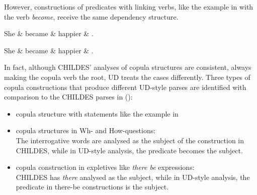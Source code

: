 However, constructions of predicates with linking verbs, like the example in  with the verb \emph{become}, receive the same dependency structure.\\

\begin{minipage}[b]{0.5\linewidth}
\begin{dependency}
	\begin{deptext}[column sep=0.5cm]
	She \& became \& happier \& .\\
	\end{deptext}
\end{dependency}
\end{minipage}
\begin{minipage}[b]{0.5\linewidth}
\begin{dependency}
	\begin{deptext}[column sep=0.5cm]
	She \& became \& happier \& .\\
	\end{deptext}
\end{dependency}
\end{minipage}
\label{fig:become}
\vspace{0.5em}

In fact, although CHILDES' analyses of copula structures are consistent, always making the copula verb the root, UD treats the cases differently. Three types of copula constructions that produce different UD-style parses are identified with comparison to the CHILDES parses in (\cite{liu2021}):
\begin{itemize}
	\item copula structure with statements like the example in 
	\item copula structures in Wh- and How-questions:\\ The interrogative words are analysed as the subject of the construction in CHILDES, while in UD-style analysis, the predicate becomes the subject.
	\item copula construction in expletives like \emph{there be} expressions:\\
	CHILDES has \emph{there} analysed as the subject, while in UD-style analysis, the predicate in there-be constructions is the subject.
\end{itemize}

